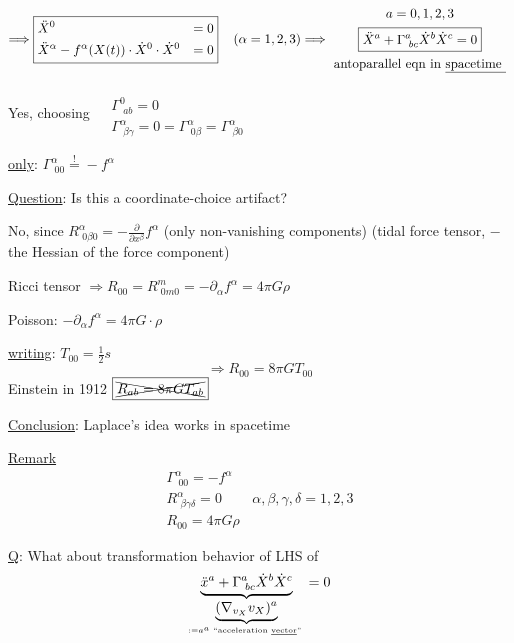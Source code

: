 \documentclass[10pt, twoside]{amsart}
\begin{document}
\begin{multicols*}{2}
\[
\Longrightarrow \boxed{ \begin{aligned}
  & \ddot{X}^0 & = 0 \\ 
  & \ddot{X}^{\alpha} - f^{\alpha}(X(t))\cdot \dot{X}^0 \cdot \dot{X}^0 & =0 
\end{aligned} } \quad \, (\alpha = 1,2,3)  \Longrightarrow \begin{gathered}
  a = 0,1,2,3 \\
  \boxed{ \ddot{X}^a + \Gamma^a_{ \, \, bc}\dot{X}^b \dot{X}^c = 0 } \\
  \text{ antoparallel eqn in \underline{spacetime } }
\end{gathered}
\]

Yes, choosing $\begin{aligned} & \quad \\
  & \Gamma^0_{ \, \, ab} = 0 \\
  & \Gamma^{\alpha}_{ \, \, \beta \gamma} = 0 =\Gamma^{\alpha}_{\,\, 0\beta} = \Gamma^{\alpha}_{ \, \, \beta 0}\end{aligned}$

\underline{only}: $\boxed{ \Gamma^{\alpha}_{ \, \, 00} \overset{!}{=} -f^{\alpha}}$

\underline{Question}: Is this a coordinate-choice artifact?

No, since $R^{\alpha}_{ \, \, 0\beta 0} = - \frac{ \partial }{ \partial x^{\beta}} f^{\alpha}$ (only non-vanishing components) (tidal force tensor, $-$ the Hessian of the force component)

Ricci tensor $\Longrightarrow  R_{00} = R^m_{ \, \, 0m0} = -\partial_{\alpha} f^{\alpha} = 4\pi G \rho$
 
Poisson: $-\partial_{\alpha}f^{\alpha} = 4\pi G\cdot \rho$

\underline{writing}: $T_{00} = \frac{1}{2}s$ 
\[
\Longrightarrow \boxed{ R_{00} = 8 \pi G T_{00} }
\]
Einstein in 1912 $ \boxed{ \xcancel{ R_{ab} = 8\pi G T_{ab} }}$


\underline{Conclusion}: Laplace's idea works in spacetime

\underline{Remark} 
\[
\begin{gathered}
  \Gamma^{\alpha}_{ \, \, 00 } = -f^{\alpha} \\ 
  R^{\alpha}_{ \, \, \beta \gamma \delta } = 0 \quad \quad \, \alpha, \beta , \gamma, \delta = 1,2,3 \\
  \boxed{ R_{00} = 4\pi G \rho }
\end{gathered}
\]

\underline{Q}: What about transformation behavior of LHS of 
\[
\underbrace{ \ddot{x}^a + \Gamma^a_{ \, \, bc } \dot{X}^b \dot{X}^c}_{ \underbrace{ (\nabla_{v_X}v_X)^a}_{ := a^a \text{ ``acceleration \underline{vector}'' } } } = 0
\]


\end{multicols*}
\end{document}
